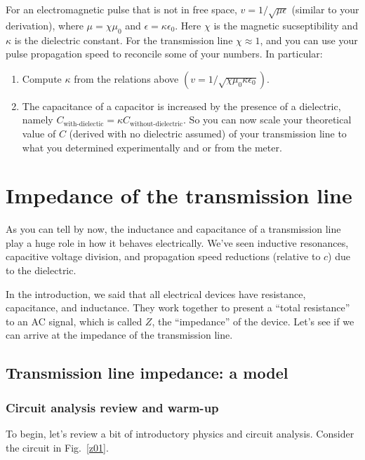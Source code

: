 \documentclass[12pt]{article}
\begin{document}
For an electromagnetic pulse that is not in free space, $v=1/\sqrt{\mu\epsilon}$ (similar to your derivation), where $\mu=\chi\mu_0$ and $\epsilon=\kappa \epsilon_0$. Here $\chi$ is the magnetic sucseptibility and $\kappa$ is the dielectric constant.  For the transmission line $\chi\approx 1$, and you can use your pulse propagation speed to reconcile some of your numbers. In particular:

\begin{enumerate}
\item Compute $\kappa$ from the relations above $(v=1/\sqrt{\chi\mu_0\kappa\epsilon_0})$.
\item The capacitance of a capacitor is increased by the presence of a dielectric, namely $C_\text{with-dielectic}=\kappa C_\text{without-dielectric}$.  So you can now scale your theoretical value of $C$ (derived with no dielectric assumed) of your transmission line to what you determined experimentally and or from the meter.
\end{enumerate}

\section{Impedance of the transmission line}
                             
As you can tell by now, the inductance and capacitance of a transmission line play a huge role in how it behaves electrically. We've seen inductive resonances, capacitive voltage division, and propagation speed reductions (relative to $c$) due to the dielectric.  

In the introduction, we said that all electrical devices have resistance, capacitance, and inductance. They work together to present a ``total resistance'' to an AC signal, which is called $Z$, the ``impedance'' of the device. Let's see if we can arrive at the impedance of the transmission line.

\subsection{Transmission line impedance: a model}

\subsubsection{Circuit analysis review and warm-up}

To begin, let's review a bit of introductory physics and circuit analysis. Consider the circuit in Fig.~\ref{z01}.
\end{document}
